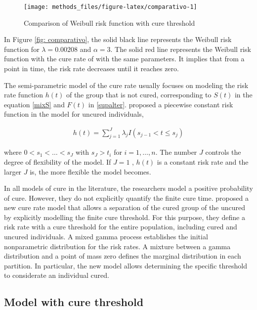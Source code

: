 \documentclass[
]{article}
\begin{document}
\begin{figure}[H]
\texttt{[image: methods\_files/figure-latex/comparativo-1]} \caption{Comparison of Weibull risk function with cure threshold}\label{fig:comparativo}
\end{figure}

In Figure \ref{fig: comparativo}, the solid black line represents the
Weibull risk function for \(\lambda = 0.00208\) and \(\alpha = 3\). The
solid red line represents the Weibull risk function with the cure rate
of \citet{Hoang1996a} with the same parameters. It implies that from a
point in time, the risk rate decreases until it reaches zero.

The semi-parametric model of the cure rate usually focuses on modeling
the risk rate function \(h (t)\) of the group that is not cured,
corresponding to \(S (t)\) in the equation \eqref{mixS} and \(F(t)\) in
\eqref{supalter}. \citet{Tsodikov2003a} proposed a piecewise constant
risk function in the model for uncured individuals,

\begin{align} \label{risk}
h(t)=\sum_{j=1}^J\lambda_j I(s_{j-1}< t \leq s_j)
\end{align}

where \(0 <s_1 <\dots <s_J\) with \(s_J> t_i\) for \(i = 1, \dots, n\).
The number \(J\) controls the degree of flexibility of the model. If
\(J = 1\) , \(h (t)\) is a constant risk rate and the larger \(J\) is,
the more flexible the model becomes.

In all models of cure in the literature, the researchers model a
positive probability of cure. However, they do not explicitly quantify
the finite cure time. \citet{Nieto-Barajas2008} proposed a new cure rate
model that allows a separation of the cured group of the uncured by
explicitly modelling the finite cure threshold. For this purpose, they
define a risk rate with a cure threshold for the entire population,
including cured and uncured individuals. A mixed gamma process
establishes the initial nonparametric distribution for the risk rates. A
mixture between a gamma distribution and a point of mass zero defines
the marginal distribution in each partition. In particular, the new
model allows determining the specific threshold to considerate an
individual cured.

\hypertarget{model-with-cure-threshold}{%
\subsection{\texorpdfstring{Model with cure threshold
\label{cap:mod_cura}}{Model with cure threshold }}\label{model-with-cure-threshold}}
\end{document}
